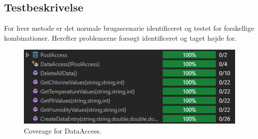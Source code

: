 \subsection{Testbeskrivelse}
For hver metode er det normale brugsscenarie identificeret og testet for forskellige kombinationer. Herefter problemerne forsøgt identificeret og taget højde for.

\begin{figure}[h]
	\centering
	\includegraphics[width=0.7\linewidth]{figs/test/dataaccesscoverage}
	\caption{Coverage for DataAccess.}
	\label{fig:dataaccesscoverage}
\end{figure}